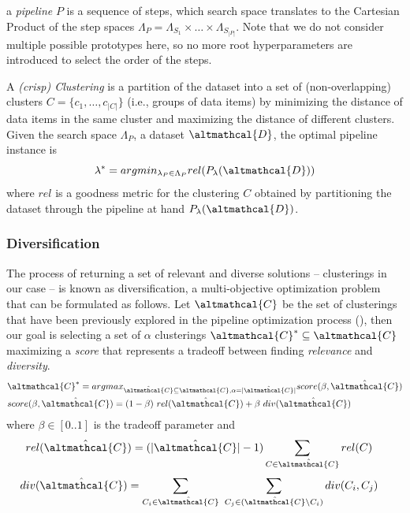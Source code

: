 a \textit{pipeline} $P$ is a sequence of steps, which search space translates to the Cartesian Product of the step spaces $\Lambda_P = \Lambda_{S_1} \times \ldots \times \Lambda_{S_{|P|}}$.
Note that we do not consider multiple possible prototypes here, so no more root hyperparameters are introduced to select the order of the steps.

A \textit{(crisp) Clustering} is a partition of the dataset into a set of (non-overlapping) clusters  $C=\{c_1, \ldots, c_{|C|}\}$ (i.e., groups of data items) by minimizing the distance of data items in the same cluster and maximizing the distance of different clusters.
Given the search space $\Lambda_P$, a dataset $\altmathcal{D}$, the optimal pipeline instance is
\begin{equation}
\label{eq:optimization}
    \lambda^* = argmin_{\lambda_P \in \Lambda_P} rel(P_{\lambda}(\altmathcal{D}))
\end{equation}
where $rel$ is a goodness metric for the clustering $C$ obtained by partitioning the dataset through the pipeline at hand $P_{\lambda}(\altmathcal{D})$.


\subsubsection{Diversification} The process of returning a set of relevant and diverse solutions -- clusterings in our case -- is known as diversification, a multi-objective optimization problem that can be formulated as follows.
%
Let $\altmathcal{C}$ be the set of clusterings that have been previously explored in the pipeline optimization process (), then our goal is selecting a set of $\alpha$ clusterings $\altmathcal{C}^* \subseteq \altmathcal{C}$ maximizing a \textit{score} that represents a tradeoff between finding \textit{relevance} and \textit{diversity}.
%
\begin{align}\label{def:score}
&\altmathcal{C}^* = argmax_{\hat{\altmathcal{C}} \subseteq \altmathcal{C}, \alpha=|\hat{\altmathcal{C}}|} score(\beta, \hat{\altmathcal{C}})\\
&score(\beta, \hat{\altmathcal{C}}) = (1-\beta)~rel(\hat{\altmathcal{C}}) + \beta~div(\hat{\altmathcal{C}})
\end{align}
where $\beta \in [0.. 1]$ is the tradeoff parameter and
\begin{align}
rel(\hat{\altmathcal{C}}) &= (|\hat{\altmathcal{C}}|-1)\sum_{C \in \hat{\altmathcal{C}}} rel(C)
\label{def:rel}
\end{align}
\vspace{-1cm}
\begin{align}
div(\hat{\altmathcal{C}}) &= \sum_{C_i \in \hat{\altmathcal{C}}}~\sum_{C_j \in (\hat{\altmathcal{C}} \setminus C_i)} div(C_i, C_j)
\label{def:div}
\end{align}

